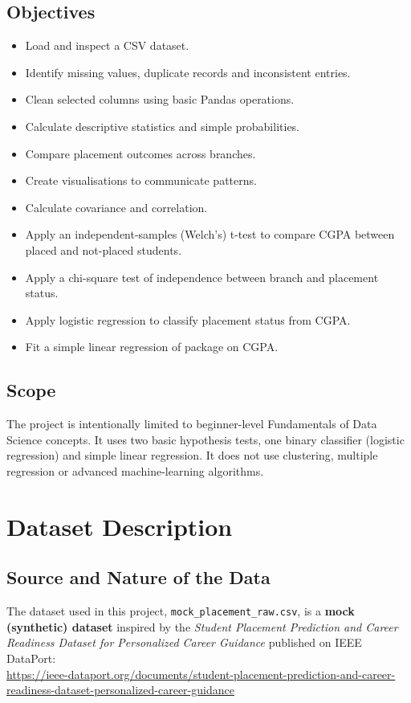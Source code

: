 \documentclass[12pt,a4paper]{article}
\begin{document}
\subsection{Objectives}
\begin{itemize}[noitemsep]
  \item Load and inspect a CSV dataset.
  \item Identify missing values, duplicate records and inconsistent entries.
  \item Clean selected columns using basic Pandas operations.
  \item Calculate descriptive statistics and simple probabilities.
  \item Compare placement outcomes across branches.
  \item Create visualisations to communicate patterns.
  \item Calculate covariance and correlation.
  \item Apply an independent-samples (Welch's) t-test to compare CGPA between placed and not-placed students.
  \item Apply a chi-square test of independence between branch and placement status.
  \item Apply logistic regression to classify placement status from CGPA.
  \item Fit a simple linear regression of package on CGPA.
\end{itemize}

\subsection{Scope}
The project is intentionally limited to beginner-level Fundamentals of Data Science concepts. It uses two basic hypothesis tests, one binary classifier (logistic regression) and simple linear regression. It does not use clustering, multiple regression or advanced machine-learning algorithms.

\section{Dataset Description}
\subsection{Source and Nature of the Data}
The dataset used in this project, \texttt{mock\_placement\_raw.csv}, is a \textbf{mock (synthetic) dataset} inspired by the \emph{Student Placement Prediction and Career Readiness Dataset for Personalized Career Guidance} published on IEEE DataPort:\\
\url{https://ieee-dataport.org/documents/student-placement-prediction-and-career-readiness-dataset-personalized-career-guidance}
\end{document}
